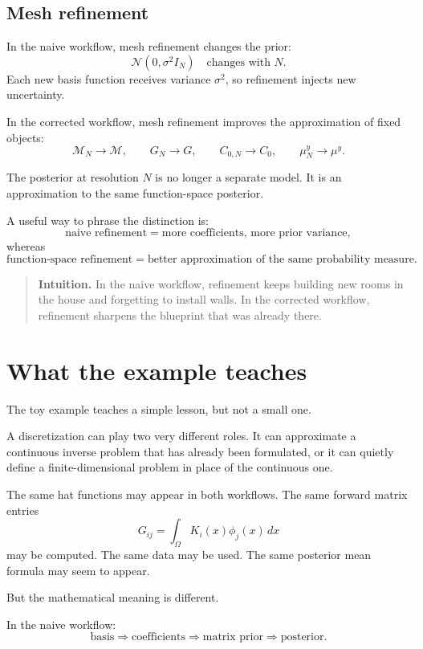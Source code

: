 \documentclass[11pt,a4paper]{book}
\newenvironment{intuition}
  {\begin{quote}\textbf{Intuition.}}
  {\end{quote}}
\newcommand{\M}{\mathcal{M}}      %
\newcommand{\post}{\mu^y}
\newcommand{\G}{G}
\begin{document}
\subsection{Mesh refinement}

In the naive workflow, mesh refinement changes the prior:
\[
    \mathcal{N}(0,\sigma^2 I_N)
    \quad
    \text{changes with } N.
\]
Each new basis function receives variance $\sigma^2$, so refinement injects
new uncertainty.

In the corrected workflow, mesh refinement improves the approximation of fixed
objects:
\[
    \M_N\to\M,
    \qquad
    G_N\to\G,
    \qquad
    C_{0,N}\to C_0,
    \qquad
    \post_N\to\post.
\]

The posterior at resolution $N$ is no longer a separate model. It is an
approximation to the same function-space posterior.

A useful way to phrase the distinction is:
\[
    \text{naive refinement}
    =
    \text{more coefficients, more prior variance},
\]
whereas
\[
    \text{function-space refinement}
    =
    \text{better approximation of the same probability measure}.
\]

\begin{intuition}
In the naive workflow, refinement keeps building new rooms in the house and
forgetting to install walls. In the corrected workflow, refinement sharpens the
blueprint that was already there.
\end{intuition}

\section{What the example teaches}

The toy example teaches a simple lesson, but not a small one.

A discretization can play two very different roles. It can approximate a
continuous inverse problem that has already been formulated, or it can quietly
define a finite-dimensional problem in place of the continuous one.

The same hat functions may appear in both workflows. The same forward matrix
entries
\[
    G_{ij}
    =
    \int_\Omega K_i(x)\phi_j(x)\,dx
\]
may be computed. The same data may be used. The same posterior mean formula may
seem to appear.

But the mathematical meaning is different.

In the naive workflow:
\[
    \text{basis}
    \Rightarrow
    \text{coefficients}
    \Rightarrow
    \text{matrix prior}
    \Rightarrow
    \text{posterior}.
\]
\end{document}
